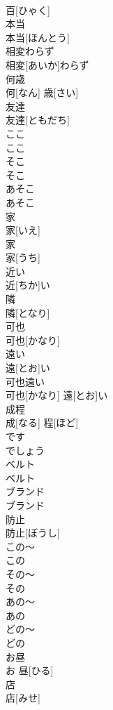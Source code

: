 \documentclass[8pt]{extreport}
\begin{document}
\begin{CJK}{UTF8}{min}
\\	百[ひゃく]
\\	本当	
\\	本当[ほんとう]
\\	相変わらず	
\\	相変[あいか]わらず
\\	何歳	
\\	何[なん] 歳[さい]
\\	友達	
\\	友達[ともだち]
\\	ここ	
\\	ここ
\\	そこ	
\\	そこ
\\	あそこ	
\\	あそこ
\\	家 
\\	家[いえ]
\\	家 
\\	家[うち]
\\	近い	
\\	近[ちか]い
\\	隣	
\\	隣[となり]
\\	可也	
\\	可也[かなり]
\\	遠い	
\\	遠[とお]い
\\	可也遠い	
\\	可也[かなり] 遠[とお]い
\\	成程	
\\	成[なる] 程[ほど]
\\	です 
\\	でしょう
\\	ベルト	
\\	ベルト
\\	ブランド	
\\	ブランド
\\	防止	
\\	防止[ぼうし]
\\	この～	
\\	この~
\\	その～	
\\	その~
\\	あの～	
\\	あの~
\\	どの～	
\\	どの~
\\	お昼	
\\	お 昼[ひる]
\\	店	
\\	店[みせ]

\end{CJK}
\end{document}
